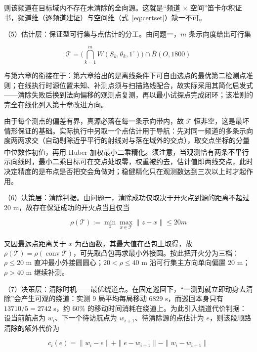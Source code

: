 \documentclass[12pt,a4paper]{ctexart}
\newcommand{\upcite}[1]{\textsuperscript{\cite{#1}}}
\begin{document}
则该频道在目标域内不存在未清除的全向源。这就是“频道 $\times$ 空间”笛卡尔积证书，频道维（逐频道建证）与空间维（式~\eqref{eq:certset}）缺一不可。

（5）估计层：保证型可行集与点估计的分工。由问题一，$m$ 条示向度给出可行集

\begin{equation}
	\mathcal T=\Big(\bigcap_{k=1}^{m}W(S_k,\theta_k,1^\circ)\Big)\cap\bar B(O,1800)
	\label{eq:feasible-set}
\end{equation}

与第六章的衔接在于：第六章给出的是离线条件下可自由选点的最优第二检测点准则；在线执行时源位置未知、补测点须与扫描路线配合，故实际采用其简化启发式——清除失败后换到法向偏移的观测点复测，再以最小试探点完成闭环；该准则的完全在线化列入第十章改进方向。

由于每个测点的偏差有界，真源必落在每一条示向带内，故 $\mathcal T$ 恒非空，这是最坏情形保证的基础。实际执行中另取一个点估计用于导航：先对同一频道的多条示向度两两求交（自动剔除近乎平行的射线对与落在域外的交点），取交点坐标的分量中位数作初值，再用 Huber 加权最小二乘\upcite{ref:Huber,ref:Soni2026}精化。须注意，当观测恰有两条不平行示向线时，最小二乘目标可在交点处取零，权重被约去，估计值即两线交点，此时决定精度的是布点是否把交会角做对；稳健精化只在观测数达到三次以上时才起作用。

（6）决策层：清除判据。由问题一，清除成功仅取决于开火点到源的距离不超过 20 m，故存在保证成功的开火点当且仅当

\begin{equation}
	\rho(\mathcal T):=\min_z\max_{x\in\mathcal T}\|z-x\|\le20 m
	\label{eq:rho-t}
\end{equation}

又因最远点距离关于 $x$ 为凸函数，其最大值在凸包\upcite{ref:CG,ref:Andrew}上取得，故 $\rho(\mathcal T)=\rho(\operatorname{conv}\mathcal T)$，可先取凸包再求最小外接圆。按此把开火分为三档：$\rho\le20$ m 直冲最小外接圆圆心；$20<\rho\le40$ m 沿可行集主方向单向偏置 20 m；$\rho>40$ m 继续补测。

（7）决策层：清除时机——最优绕道点。在固定巡回下，“一测到就立即动身去清除”会产生可观的绕道：实测 9 局平均每局移动 6829 s，而巡回本身只有 $13710/5=2742$ s，约 60\% 的移动时间消耗在绕道上。为此引入绕道代价判据：设当前航点为 $w_i$、下一个待访航点为 $w_{i+1}$、待清除源的点估计为 $e$，则该段顺路清除的额外代价为

\begin{equation}
	c_i(e)=\|w_i-e\|+\|e-w_{i+1}\|-\|w_i-w_{i+1}\|
	\label{eq:detour}
\end{equation}
\end{document}
